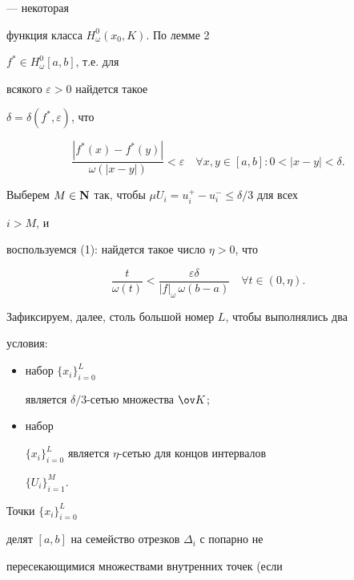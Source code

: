 \begin{pf}
--- некоторая


функция класса $H^0_\omega(x_0,K)$. По лемме 2\;


$f^*\in H^0_\omega[a,b]$, т.е. для


всякого $\varepsilon>0$ найдется такое


$\delta=\delta(f^*,\varepsilon)$, что


\begin{equation}


\frac{|f^*(x)-f^*(y)|}{\omega(|x-y|)}<\varepsilon \quad


\forall x,y\in[a,b]:0<|x-y|<\delta.


\end{equation}





Выберем $M\in\bold N$ так, чтобы $\mu U_i=u^+_i-u^-_i\le\delta/3$ для всех


$i>M$, и


воспользуемся (1): найдется такое число $\eta>0$, что


\begin{equation}


\frac{t}{\omega(t)}<\frac{\varepsilon\delta}


{|f|_\omega\,\omega(b-a)}\quad \forall t\in(0,\eta).


\end{equation}


Зафиксируем, далее, столь большой номер $L$, чтобы выполнялись два


условия:


\begin{itemize}


\item[(i)] набор $\{x_i\}^L_{i=0}$


является $\delta/3$-сетью множества $\ov K$;


\item[(ii)] набор


$\{x_i\}^L_{i=0}$ является $\eta$-сетью для концов интервалов


$\{U_i\}^M_{i=1}$.


\end{itemize}





Точки $\{x_i\}^L_{i=0}$


делят $[a,b]$ на семейство отрезков $\Delta_i$ с попарно не


пересекающимися множествами внутренних точек (если



\end{pf}
